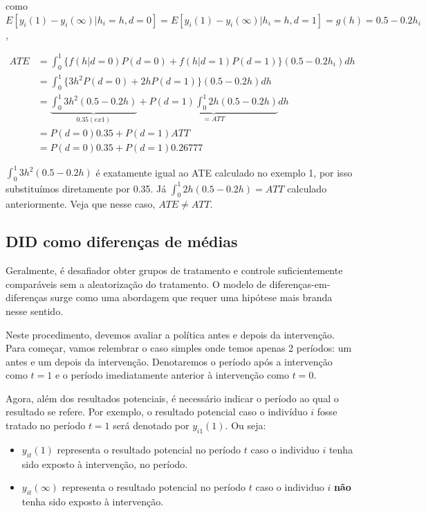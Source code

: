 \documentclass[portugues]{article}
\begin{document}
\begin{box_ex}
    \noindent como $E[y_i(1) - y_i(\infty)|h_i=h, d=0] = E[y_i(1) - y_i(\infty)|h_i=h, d=1] = g(h) = 0.5 - 0.2 h_i$, 
    
    
    \[
    \begin{split}
        ATE &= \int_{0}^1 \{f(h | d=0) P(d=0) + f(h | d=1) P(d=1)\} (0.5 - 0.2 h_i) dh \\
            &= \int_{0}^1 \{ 3h^2 P(d=0) + 2h P(d=1)\} (0.5 - 0.2 h) dh \\
            &=  \underbrace{\int_{0}^1  3h^2 (0.5 - 0.2 h)}_{0.35 (ex 1)}  +  \underbrace{P(d=1) \int_0^1 2h (0.5 - 0.2 h)}_{=ATT}  dh \\
            &= P(d=0) 0.35 + P(d=1) ATT \\
            &=  P(d=0) 0.35 + P(d=1) 0.26777
    \end{split}
    \]
    
    $\int_{0}^1  3h^2 (0.5 - 0.2 h)$ é exatamente igual ao ATE calculado no exemplo 1, por isso substituímos diretamente por 0.35. Já $\int_0^1 2h (0.5 - 0.2 h) = ATT$ calculado anteriormente. Veja que nesse caso, $ATE \neq ATT$.

\end{box_ex}

\subsection{DID como diferenças de médias} \label{sec:DID_DIF_MEDIA}

Geralmente, é desafiador obter grupos de tratamento e controle suficientemente comparáveis sem a aleatorização do tratamento. O modelo de diferenças-em-diferenças surge como uma abordagem que requer uma hipótese mais branda nesse sentido.

Neste procedimento, devemos avaliar a política antes e depois da intervenção. Para começar, vamos relembrar o caso simples onde temos apenas 2 períodos: um antes e um depois da intervenção. Denotaremos o período após a intervenção como $t = 1$ e o período imediatamente anterior à intervenção como $t = 0$. 

Agora, além dos resultados potenciais, é necessário indicar o período ao qual o resultado se refere. Por exemplo, o resultado potencial caso o indivíduo $i$ fosse tratado no período $t=1$ será denotado por $y_{i1}(1)$. Ou seja:

\begin{itemize}
    \item $y_{it}(1)$ representa o resultado potencial no período $t$ caso o individuo $i$ tenha sido exposto à intervenção, no período.
    \item $y_{it}(\infty)$ representa o resultado potencial no período $t$ caso o individuo $i$ \textbf{não} tenha sido exposto à intervenção.
\end{itemize}
\end{document}
